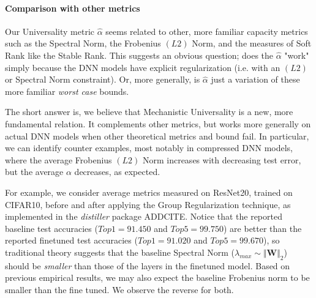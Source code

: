 \paragraph{Comparison with other metrics}
Our Universality metric $\hat{\alpha}$ seems related to other, more familiar capacity metrics such as the Spectral Norm, the Frobenius $(L2)$ Norm, and the measures of Soft Rank like the Stable Rank.
This suggests an obvious question; does the  $\hat{\alpha}$ "work" simply because the DNN models have explicit regularization (i.e. with an $(L2)$ or Spectral Norm constraint).
Or, more generally, is $\hat{\alpha}$ just a variation of these more familiar \emph{worst case} bounds.  

The short answer is, we believe that Mechanistic Universality is a new, more fundamental relation.  It complements other metrics, but works more generally on actual DNN models
when other theoretical metrics and bound fail.  In particular, we can identify counter examples, most notably in compressed DNN models, where the average Frobenius $(L2)$ Norm
increases with decreasing test error, but the average $\alpha$ decreases, as expected.  


For example, we consider average metrics measured on ResNet20, trained on CIFAR10, before and after applying the Group Regularization technique, 
as implemented in the \emph{distiller} package ADDCITE. 
Notice that the reported baseline test accuracies ($Top1=91.450$ and $Top5=99.750$) 
are better than the reported finetuned test accuracies ($Top1=91.020$ and $Top5=99.670$), so traditional theory suggests that the baseline Spectral Norm
($\lambda_{max}\sim\Vert\mathbf{W}\Vert_{2}$) should be \emph{smaller} than those of the layers in the finetuned model.
Based on previous empirical results, we may also expect the baseline Frobenius norm to be smaller than the fine tuned.  We observe the reverse for both.

